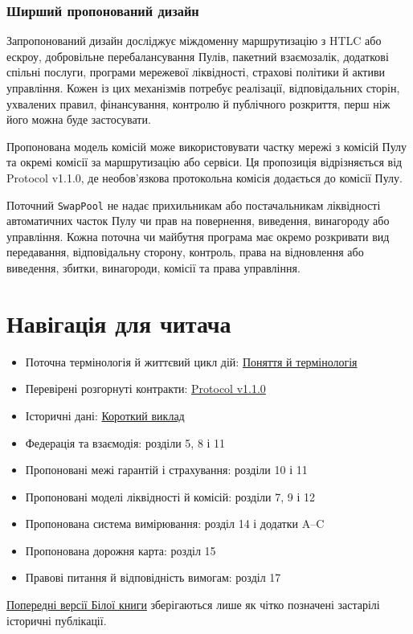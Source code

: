 \documentclass[11pt]{article}
\begin{document}
\subsubsection*{Ширший пропонований дизайн}

Запропонований дизайн досліджує міждоменну маршрутизацію з HTLC або ескроу, добровільне перебалансування Пулів, пакетний взаємозалік, додаткові спільні послуги, програми мережевої ліквідності, страхові політики й активи управління. Кожен із цих механізмів потребує реалізації, відповідальних сторін, ухвалених правил, фінансування, контролю й публічного розкриття, перш ніж його можна буде застосувати.

Пропонована модель комісій може використовувати частку мережі з комісій Пулу та окремі комісії за маршрутизацію або сервіси. Ця пропозиція відрізняється від Protocol v1.1.0, де необов'язкова протокольна комісія додається до комісії Пулу.

Поточний \texttt{SwapPool} не надає прихильникам або постачальникам ліквідності автоматичних часток Пулу чи прав на повернення, виведення, винагороду або управління. Кожна поточна чи майбутня програма має окремо розкривати вид передавання, відповідальну сторону, контроль, права на відновлення або виведення, збитки, винагороди, комісії та права управління.

\section*{Навігація для читача}

\begin{itemize}[leftmargin=*]
\item Поточна термінологія й життєвий цикл дій: \href{https://docs.cosmolocal.credit/uk/introduction/concepts}{Поняття й термінологія}
\item Перевірені розгорнуті контракти: \href{https://docs.cosmolocal.credit/uk/protocol/overview}{Protocol v1.1.0}
\item Історичні дані: \href{https://docs.cosmolocal.credit/uk/white-paper/executive-summary}{Короткий виклад}
\item Федерація та взаємодія: розділи 5, 8 і 11
\item Пропоновані межі гарантій і страхування: розділи 10 і 11
\item Пропоновані моделі ліквідності й комісій: розділи 7, 9 і 12
\item Пропонована система вимірювання: розділ 14 і додатки A--C
\item Пропонована дорожня карта: розділ 15
\item Правові питання й відповідність вимогам: розділ 17
\end{itemize}
\href{https://docs.cosmolocal.credit/uk/white-paper/archive}{Попередні версії Білої книги} зберігаються лише як чітко позначені застарілі історичні публікації.
\end{document}
